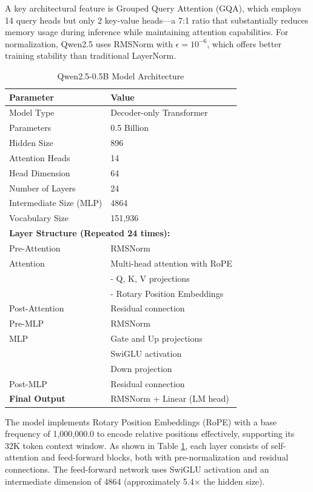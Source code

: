 \documentclass{article}
\begin{document}
A key architectural feature is Grouped Query Attention (GQA), which employs 14 query heads but only 2 key-value heads—a 7:1 ratio that substantially reduces memory usage during inference while maintaining attention capabilities. For normalization, Qwen2.5 uses RMSNorm with $\epsilon = 10^{-6}$, which offers better training stability than traditional LayerNorm.
\begin{table}[ht]
\centering
\begin{tabular}{ll}
\hline
\textbf{Parameter} & \textbf{Value} \\
\hline
Model Type & Decoder-only Transformer \\
Parameters & 0.5 Billion \\
Hidden Size & 896 \\
Attention Heads & 14 \\
Head Dimension & 64 \\
Number of Layers & 24 \\
Intermediate Size (MLP) & 4864 \\
Vocabulary Size & 151,936 \\
\hline
\multicolumn{2}{l}{\textbf{Layer Structure (Repeated 24 times):}} \\
\hline
Pre-Attention & RMSNorm \\
Attention & Multi-head attention with RoPE \\
& \quad - Q, K, V projections \\
& \quad - Rotary Position Embeddings \\
Post-Attention & Residual connection \\
Pre-MLP & RMSNorm \\
MLP & Gate and Up projections \\
& SwiGLU activation \\
& Down projection \\
Post-MLP & Residual connection \\
\hline
\textbf{Final Output} & RMSNorm + Linear (LM head) \\
\hline
\end{tabular}
\caption{Qwen2.5-0.5B Model Architecture}
\label{tab:qwen25-overview} 
\end{table}
The model implements Rotary Position Embeddings (RoPE) with a base frequency of 1,000,000.0 to encode relative positions effectively, supporting its 32K token context window. As shown in Table \ref{tab:qwen25-overview}, each layer consists of self-attention and feed-forward blocks, both with pre-normalization and residual connections. The feed-forward network uses SwiGLU activation and an intermediate dimension of 4864 (approximately 5.4× the hidden size).
\end{document}
